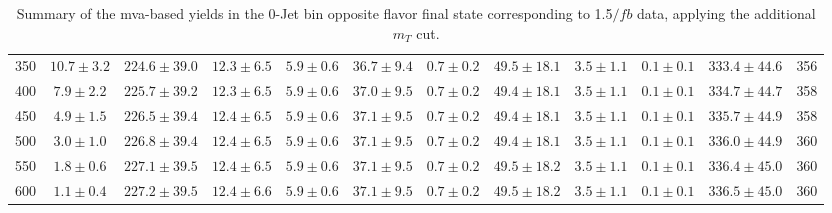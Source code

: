 \begin{table}
{\begin{center}
\begin{tabular}{l c c c c c c c c c c c }
350 & $10.7\pm3.2$ & $224.6\pm39.0$ & $12.3\pm6.5$ & $5.9\pm0.6$ & $36.7\pm9.4$ & $0.7\pm0.2$ & $49.5\pm18.1$ & $3.5\pm1.1$ & $0.1\pm0.1$ & $333.4\pm44.6$ & 356 \\
400 & $7.9\pm2.2$ & $225.7\pm39.2$ & $12.3\pm6.5$ & $5.9\pm0.6$ & $37.0\pm9.5$ & $0.7\pm0.2$ & $49.4\pm18.1$ & $3.5\pm1.1$ & $0.1\pm0.1$ & $334.7\pm44.7$ & 358 \\
450 & $4.9\pm1.5$ & $226.5\pm39.4$ & $12.4\pm6.5$ & $5.9\pm0.6$ & $37.1\pm9.5$ & $0.7\pm0.2$ & $49.4\pm18.1$ & $3.5\pm1.1$ & $0.1\pm0.1$ & $335.7\pm44.9$ & 358 \\
500 & $3.0\pm1.0$ & $226.8\pm39.4$ & $12.4\pm6.5$ & $5.9\pm0.6$ & $37.1\pm9.5$ & $0.7\pm0.2$ & $49.4\pm18.1$ & $3.5\pm1.1$ & $0.1\pm0.1$ & $336.0\pm44.9$ & 360 \\
550 & $1.8\pm0.6$ & $227.1\pm39.5$ & $12.4\pm6.5$ & $5.9\pm0.6$ & $37.1\pm9.5$ & $0.7\pm0.2$ & $49.5\pm18.2$ & $3.5\pm1.1$ & $0.1\pm0.1$ & $336.4\pm45.0$ & 360 \\
600 & $1.1\pm0.4$ & $227.2\pm39.5$ & $12.4\pm6.6$ & $5.9\pm0.6$ & $37.1\pm9.5$ & $0.7\pm0.2$ & $49.5\pm18.2$ & $3.5\pm1.1$ & $0.1\pm0.1$ & $336.5\pm45.0$ & 360 \\
\hline
\end{tabular}
\end{center}
}
\caption{Summary of the mva-based yields in the 0-Jet bin opposite flavor final state corresponding to 1.5$/fb$ data, applying the additional $m_T$ cut.}
\end{table}

